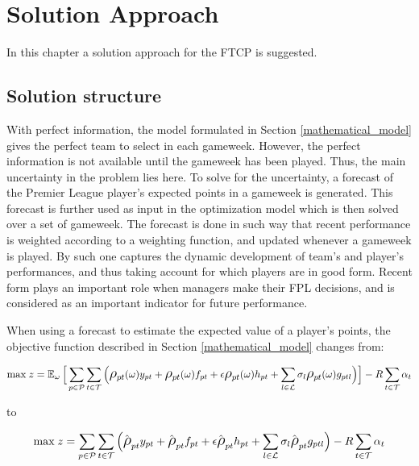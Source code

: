 

\chapter{Solution Approach} \label{chapter_solution_approach}

In this chapter a solution approach for the FTCP is suggested. 

\section{Solution structure}
With perfect information, the model formulated in Section \ref{mathematical_model} gives the perfect team to select in each gameweek. However, the perfect information is not available until the gameweek has been played. Thus, the main uncertainty in the problem lies here. To solve for the uncertainty, a forecast of the Premier League player's expected points in a gameweek is generated. This forecast is further used as input in the optimization model which is then solved over a set of gameweek. The forecast is done in such way that recent performance is weighted according to a weighting function, and updated whenever a gameweek is played. By such one captures the dynamic development of team's and player's performances, and thus taking account for which players are in good form. Recent form plays an important role when managers make their FPL decisions, and is considered as an important indicator for future performance.   

\newpar
\newpage
When using a forecast to estimate the expected value of a player's points, the objective function described in Section \ref{mathematical_model} changes from: 

\begin{equation*}
\text{max} \; z = \EX_{\omega} \Big\lbrack\sum_{p \in \mathcal{P}} \sum_{t \in \mathcal{T}} \Big( \mathlarger{\rho}_{pt}(\omega)y_{pt} +  \mathlarger{\rho}_{pt}(\omega)f_{pt} + \epsilon \mathlarger{\rho}_{pt}(\omega)h_{pt} + \sum_{l \in \mathcal{L}}\sigma_{l} \mathlarger{\rho}_{pt}(\omega)g_{ptl} \Big) \Big\rbrack - R\sum_{t \in \mathcal{T}}\alpha_{t}
\end{equation*}

to 

\begin{equation*}
\text{max} \; z = \sum_{p \in \mathcal{P}} \sum_{t \in \mathcal{T}} \Big( \hat{\mathlarger{\rho}}_{pt} y_{pt} + \hat{\mathlarger{\rho}}_{pt}f_{pt} + \epsilon \hat{\mathlarger{\rho}}_{pt}h_{pt} + \sum_{l \in \mathcal{L}}\sigma_{l} \hat{\mathlarger{\rho}}_{pt} g_{ptl} \Big) - R\sum_{t \in \mathcal{T}}\alpha_{t}
\end{equation*}

